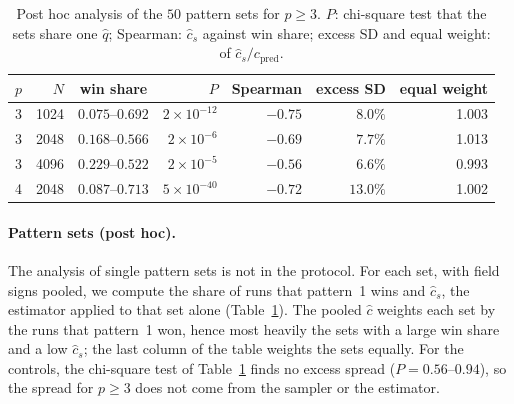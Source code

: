 \documentclass[final]{dynafront2026}
\begin{document}
\begin{table}[!htb]
 \centering
 \caption{Post hoc analysis of the $50$ pattern sets for $p\ge3$. $P$: chi-square test that
 the sets share one $\widehat q$; Spearman: $\widehat c_s$ against win share; excess SD and
 equal weight: of $\widehat c_s/c_{\mathrm{pred}}$.}
 \label{tab:sets}
 \begin{tabular}{rrcrrrr}
 \toprule
 $p$ & $N$ & win share & $P$ & Spearman & excess SD & equal weight\\
 \midrule
 3 & 1024 & $0.075$--$0.692$ & $2\times10^{-12}$ & $-0.75$ & $8.0\%$ & 1.003\\
 3 & 2048 & $0.168$--$0.566$ & $2\times10^{-6}$ & $-0.69$ & $7.7\%$ & 1.013\\
 3 & 4096 & $0.229$--$0.522$ & $2\times10^{-5}$ & $-0.56$ & $6.6\%$ & 0.993\\
 4 & 2048 & $0.087$--$0.713$ & $5\times10^{-40}$ & $-0.72$ & $13.0\%$ & 1.002\\
 \bottomrule
 \end{tabular}
\end{table}

\paragraph{Pattern sets (post hoc).}
The analysis of single pattern sets is not in the protocol. For each set,
with field signs pooled, we compute the share of runs that pattern~1 wins and
$\widehat c_s$, the estimator applied to that set alone
(Table~\ref{tab:sets}). The pooled $\widehat c$ weights each set by the runs
that pattern~1 won, hence most heavily the sets with a large win share and a
low $\widehat c_s$; the last column of the table weights the sets equally. For the controls, the chi-square test of Table~\ref{tab:sets}
finds no excess spread ($P=0.56$--$0.94$), so the spread
for $p\ge3$ does not come from the sampler or the estimator.
\end{document}
